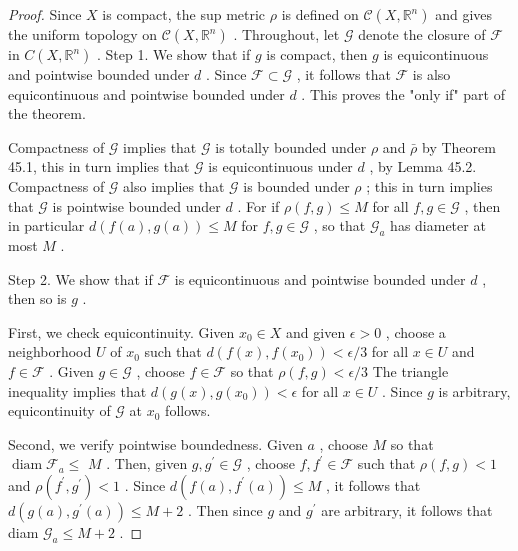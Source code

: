 \begin{proof}Since \(X\) is compact, the sup metric \(\rho\) is defined on \(\mathcal{C}\left( {X,{\mathbb{R}}^{n}}\right)\) and gives the uniform topology on \(\mathcal{C}\left( {X,{\mathbb{R}}^{n}}\right)\) . Throughout, let \(\mathcal{G}\) denote the closure of \(\mathcal{F}\) in \(C\left( {X,{\mathbb{R}}^{n}}\right)\) .
Step 1. We show that if \(g\) is compact, then \(g\) is equicontinuous and pointwise bounded under \(d\) . Since \(\mathcal{F} \subset  \mathcal{G}\) , it follows that \(\mathcal{F}\) is also equicontinuous and pointwise bounded under \(d\) . This proves the "only if" part of the theorem.

Compactness of \(\mathcal{G}\) implies that \(\mathcal{G}\) is totally bounded under \(\rho\) and \(\bar{\rho }\) by Theorem 45.1, this in turn implies that \(\mathcal{G}\) is equicontinuous under \(d\) , by Lemma 45.2. Compactness of \(\mathcal{G}\) also implies that \(\mathcal{G}\) is bounded under \(\rho\) ; this in turn implies that \(\mathcal{G}\) is pointwise bounded under \(d\) . For if \(\rho \left( {f,g}\right)  \leq  M\) for all \(f,g \in  \mathcal{G}\) , then in particular \(d\left( {f\left( a\right) ,g\left( a\right) }\right)  \leq  M\) for \(f,g \in  \mathcal{G}\) , so that \({\mathcal{G}}_{a}\) has diameter at most \(M\) .

Step 2. We show that if \(\mathcal{F}\) is equicontinuous and pointwise bounded under \(d\) , then so is \(g\) .

First, we check equicontinuity. Given \({x}_{0} \in  X\) and given \(\epsilon  > 0\) , choose a neighborhood \(U\) of \({x}_{0}\) such that \(d\left( {f\left( x\right) ,f\left( {x}_{0}\right) }\right)  < \epsilon /3\) for all \(x \in  U\) and \(f \in  \mathcal{F}\) . Given \(g \in  \mathcal{G}\) , choose \(f \in  \mathcal{F}\) so that \(\rho \left( {f,g}\right)  < \epsilon /3\) The triangle inequality implies that \(d\left( {g\left( x\right) ,g\left( {x}_{0}\right) }\right)  < \epsilon\) for all \(x \in  U\) . Since \(g\) is arbitrary, equicontinuity of \(\mathcal{G}\) at \({x}_{0}\) follows.

Second, we verify pointwise boundedness. Given \(a\) , choose \(M\) so that \(\operatorname{diam}{\mathcal{F}}_{a} \leq\)  \(M\) . Then, given \(g,{g}^{\prime } \in  \mathcal{G}\) , choose \(f,{f}^{\prime } \in  \mathcal{F}\) such that \(\rho \left( {f,g}\right)  < 1\) and \(\rho \left( {{f}^{\prime },{g}^{\prime }}\right)  < 1\) . Since \(d\left( {f\left( a\right) ,{f}^{\prime }\left( a\right) }\right)  \leq  M\) , it follows that \(d\left( {g\left( a\right) ,{g}^{\prime }\left( a\right) }\right)  \leq  M + 2\) . Then since \(g\) and \({g}^{\prime }\) are arbitrary, it follows that diam \({\mathcal{G}}_{a} \leq  M + 2\) .


\end{proof}
